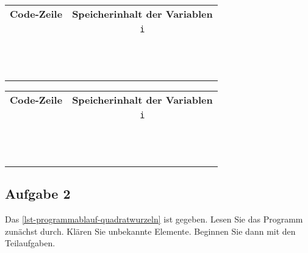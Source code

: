 \begin{table}[htb]
\centering
\begin{minipage}{0.45\textwidth}
\begin{tabular}{cc}
\toprule
\textbf{Code-Zeile} & \textbf{Speicherinhalt der Variablen} \\
			   & \lstinline[]$i$ \\
\midrule
& \\ \hline
& \\ \hline
& \\ \hline
& \\ \hline
& \\ \hline
& \\ \hline
& \\ \hline
& \\ \hline
& \\ \hline
& \\ \hline
& \\ \hline
& \\
\bottomrule
\end{tabular}
\end{minipage}
\hfill
\begin{minipage}{0.45\textwidth}
\begin{tabular}{cc}
\toprule
\textbf{Code-Zeile} & \textbf{Speicherinhalt der Variablen} \\
			   & \lstinline[]$i$ \\
\midrule
& \\ \hline
& \\ \hline
& \\ \hline
& \\ \hline
& \\ \hline
& \\ \hline
& \\ \hline
& \\ \hline
& \\ \hline
& \\ \hline
& \\ \hline
& \\
\bottomrule
\end{tabular}
\end{minipage}
\end{table}

\newpage

\subsection{Aufgabe 2}

Das \autoref{lst-programmablauf-quadratwurzeln} ist gegeben. Lesen Sie das Programm zunächst durch. Klären Sie unbekannte Elemente.  Beginnen Sie dann mit den Teilaufgaben.

